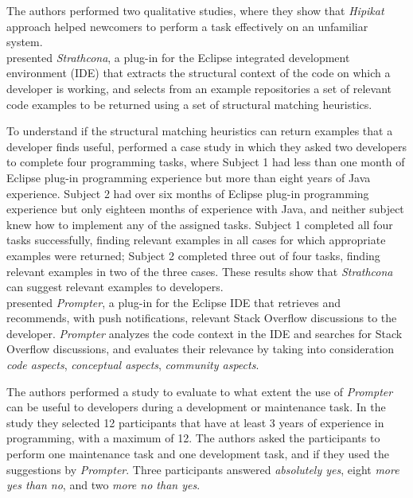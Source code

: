 \documentclass[12pt,mscthesis]{usiinfthesis}
\begin{document}
	The authors performed two qualitative studies, where they show that \emph{Hipikat} approach helped newcomers to perform a task effectively on an unfamiliar system.\\


	\citet{Holmes:2005:USC:1062455.1062491}  presented \emph{Strathcona}, a plug-in for the Eclipse integrated development environment (IDE) that extracts the structural context of the code on which a developer is working, and selects from an example repositories a set of relevant code examples to be returned using a set of structural matching heuristics.


	To understand if the structural matching heuristics can return examples that a developer finds useful, \citet{Holmes:2005:USC:1062455.1062491} performed a case study in which they asked two developers to complete four programming tasks, where Subject 1 had less than one month of Eclipse plug-in programming experience but more than eight years of Java experience. Subject 2 had over six months of Eclipse plug-in programming experience but only eighteen months of experience with Java, and neither subject knew how to implement any of the assigned tasks.
	Subject 1 completed all four tasks successfully, finding relevant examples in all cases for which appropriate examples were returned; Subject 2 completed three out of four tasks, finding relevant examples in two of the three cases. These results show that \emph{Strathcona} can suggest relevant examples to developers.\\

	\citet{Ponz2014b} presented \emph{Prompter}, a plug-in for the Eclipse IDE that retrieves and recommends, with push notifications, relevant Stack Overflow discussions to the developer. \emph{Prompter} analyzes the code context in the IDE and searches for Stack Overflow discussions, and evaluates their relevance by taking into consideration \emph{code aspects}, \emph{conceptual aspects}, \emph{community aspects}.


	The authors performed a study to evaluate to what extent the use of \emph{Prompter} can be useful to developers during a development or maintenance task. In the study they selected 12 participants that have at least 3 years of experience in programming, with a maximum of 12. The authors asked the participants to perform one maintenance task and one development task, and if they used the suggestions by \emph{Prompter}. Three participants answered \emph{absolutely yes}, eight \emph{more yes than no}, and two \emph{more no than yes}.
\end{document}
